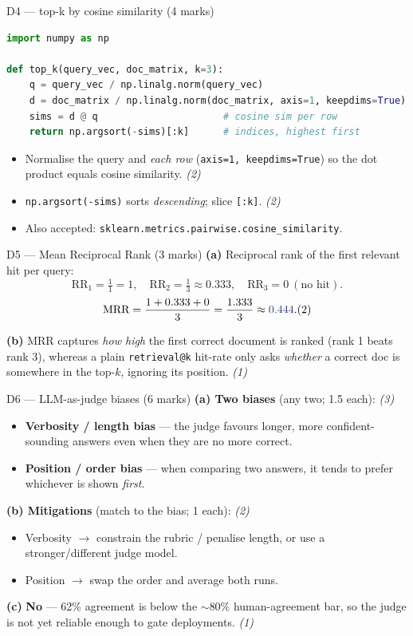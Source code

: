 \documentclass[aspectratio=169,11pt]{beamer}
\begin{document}
\begin{frame}[fragile]{D4 --- top-k by cosine similarity (4 marks)}
\begin{lstlisting}[language=Python]
import numpy as np

def top_k(query_vec, doc_matrix, k=3):
    q = query_vec / np.linalg.norm(query_vec)
    d = doc_matrix / np.linalg.norm(doc_matrix, axis=1, keepdims=True)
    sims = d @ q                      # cosine sim per row
    return np.argsort(-sims)[:k]      # indices, highest first
\end{lstlisting}
\begin{itemize}
  \item Normalise the query and \emph{each row} (\texttt{axis=1, keepdims=True}) so the dot product
        equals cosine similarity. \hfill \emph{(2)}
  \item \texttt{np.argsort(-sims)} sorts \emph{descending}; slice \texttt{[:k]}. \hfill \emph{(2)}
  \item \textcolor{cgreen}{Also accepted:} \texttt{sklearn.metrics.pairwise.cosine\_similarity}.
\end{itemize}
\end{frame}

\begin{frame}{D5 --- Mean Reciprocal Rank (3 marks)}
\textbf{(a)} Reciprocal rank of the first relevant hit per query:
\[
\text{RR}_1 = \tfrac{1}{1}=1,\quad \text{RR}_2 = \tfrac{1}{3}\approx 0.333,\quad \text{RR}_3 = 0 \ (\text{no hit}).
\]
\[
\text{MRR} = \frac{1 + 0.333 + 0}{3} = \frac{1.333}{3} \approx \textcolor{hsbiblue}{0.444}. \hfill (2)
\]

\textbf{(b)} MRR captures \emph{how high} the first correct document is ranked (rank 1 beats rank 3),
whereas a plain \texttt{retrieval@k} hit-rate only asks \emph{whether} a correct doc is somewhere in
the top-$k$, ignoring its position. \hfill \emph{(1)}
\end{frame}

\begin{frame}{D6 --- LLM-as-judge biases (6 marks)}
\textbf{(a) Two biases} (any two; 1.5 each): \hfill \emph{(3)}
\begin{itemize}
  \item \textbf{Verbosity / length bias} --- the judge favours longer, more confident-sounding
        answers even when they are no more correct.
  \item \textbf{Position / order bias} --- when comparing two answers, it tends to prefer whichever
        is shown \emph{first}.
\end{itemize}
\textbf{(b) Mitigations} (match to the bias; 1 each): \hfill \emph{(2)}
\begin{itemize}
  \item Verbosity $\to$ constrain the rubric / penalise length, or use a stronger/different judge model.
  \item Position $\to$ \textcolor{cgreen}{swap the order and average both runs}.
\end{itemize}
\textbf{(c)} \textbf{No} --- 62\% agreement is below the $\sim$80\% human-agreement bar, so the judge
is not yet reliable enough to gate deployments. \hfill \emph{(1)}
\end{frame}
\end{document}
